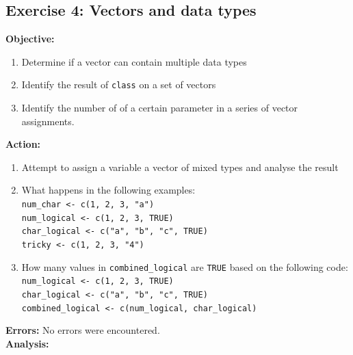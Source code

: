 \documentclass{article}
\begin{document}
\subsection{Exercise 4: Vectors and data types}
\textbf{Objective:}
\begin{enumerate}
    \item Determine if a vector can contain multiple data types
    \item Identify the result of \verb|class| on a set of vectors
    \item Identify the number of of a certain parameter in a series of vector assignments.
\end{enumerate}
\textbf{Action:}
\begin{enumerate}
    \item Attempt to assign a variable a vector of mixed types and analyse the result
    \item What happens in the following examples:\\
    \verb|num_char <- c(1, 2, 3, "a")|\\
    \verb|num_logical <- c(1, 2, 3, TRUE)|\\
    \verb|char_logical <- c("a", "b", "c", TRUE)|\\
    \verb|tricky <- c(1, 2, 3, "4")|
    \item How many values in \verb|combined_logical| are \verb"TRUE" based on the following code:\\
    \verb|num_logical <- c(1, 2, 3, TRUE)|\\
    \verb|char_logical <- c("a", "b", "c", TRUE)|\\
    \verb|combined_logical <- c(num_logical, char_logical)|
\end{enumerate}
\textbf{Errors:} No errors were encountered.\\
\textbf{Analysis:}
\end{document}
